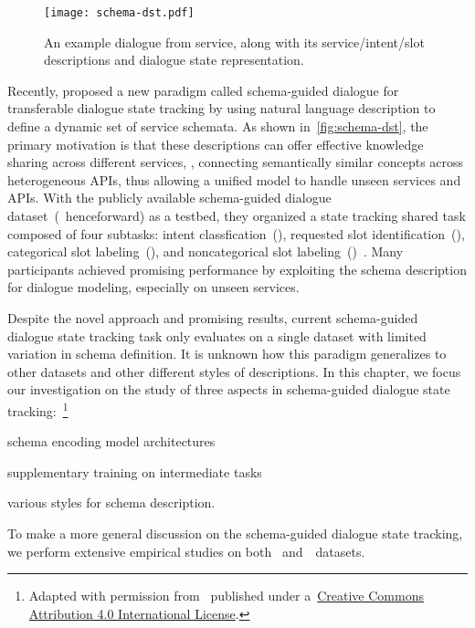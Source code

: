 \begin{figure}[!tbp]
\begin{center}
  \texttt{[image: schema-dst.pdf]}
\end{center}
  \caption{\label{fig:schema-dst} An example dialogue from  service, along with its service/intent/slot descriptions and dialogue state representation.}
\end{figure}


Recently, \citet{rastogi2019towards} proposed a new paradigm called
schema-guided dialogue for transferable dialogue state tracking by using
natural language description to define a dynamic set of service
schemata. As shown in~\autoref{fig:schema-dst}, the primary
motivation is that these descriptions can offer effective knowledge
sharing across different services, \ie, connecting semantically
similar concepts across heterogeneous APIs, thus allowing a unified
model to handle unseen services and APIs. With the publicly available
schema-guided dialogue dataset~(\sgdst~henceforward) as a
testbed, they organized a state tracking shared task composed of four subtasks:
intent classfication~(\IC), requested slot identification~(\RSI),
categorical slot labeling~(\CSL), and noncategorical slot
labeling~(\NSL)~\cite{rastogi2020schema}. Many participants achieved
promising performance by exploiting the schema description for dialogue
modeling, especially on unseen services.

Despite the novel approach and promising results, current
schema-guided dialogue state tracking task only evaluates on a single
dataset with limited variation in schema definition. It is unknown how
this paradigm generalizes to other datasets and other different styles
of descriptions. In this chapter, we focus our investigation on the
study of three aspects in schema-guided dialogue state
tracking:~\footnote{Adapted with permission from~\citet{cao2021schema}
  published under
  a~\href{https://creativecommons.org/licenses/by/4.0/}{Creative
    Commons Attribution 4.0 International License}.}
\begin{inparaenum}[(1)]
\item schema encoding model architectures
\item supplementary training on intermediate tasks
\item various styles for schema description.
\end{inparaenum}
To make a more general discussion on
the schema-guided dialogue state tracking, we perform extensive
empirical studies on both \sgdst~and~\multiwoz~datasets.

